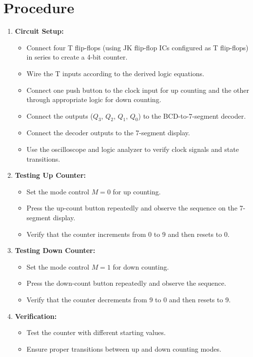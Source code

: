 \documentclass[12pt]{article}
\begin{document}
\section*{Procedure}
\begin{enumerate}
    \item \textbf{Circuit Setup:}
    \begin{itemize}
        \item Connect four T flip-flops (using JK flip-flop ICs configured as T flip-flops) in series to create a 4-bit counter.
        \item Wire the T inputs according to the derived logic equations.
        \item Connect one push button to the clock input for up counting and the other through appropriate logic for down counting.
        \item Connect the outputs (\(Q_3\), \(Q_2\), \(Q_1\), \(Q_0\)) to the BCD-to-7-segment decoder.
        \item Connect the decoder outputs to the 7-segment display.
        \item Use the oscilloscope and logic analyzer to verify clock signals and state transitions.
    \end{itemize}
    \item \textbf{Testing Up Counter:}
    \begin{itemize}
        \item Set the mode control \(M=0\) for up counting.
        \item Press the up-count button repeatedly and observe the sequence on the 7-segment display.
        \item Verify that the counter increments from 0 to 9 and then resets to 0.
    \end{itemize}
    \item \textbf{Testing Down Counter:}
    \begin{itemize}
        \item Set the mode control \(M=1\) for down counting.
        \item Press the down-count button repeatedly and observe the sequence.
        \item Verify that the counter decrements from 9 to 0 and then resets to 9.
    \end{itemize}
    \item \textbf{Verification:}
    \begin{itemize}
        \item Test the counter with different starting values.
        \item Ensure proper transitions between up and down counting modes.
    \end{itemize}
\end{enumerate}
\end{document}
